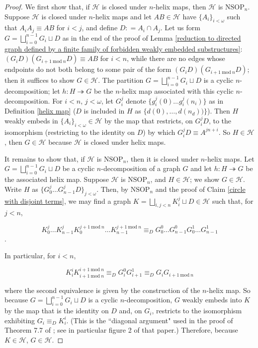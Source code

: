 \documentclass{amsart}
\theoremstyle{definition}
\theoremstyle{remark}
\numberwithin{equation}{section}
\begin{document}
\begin{proof}
    We first show that, if $\mathcal{H}$ is closed under $n$-helix maps, then $\mathcal{H}$ is $\mathrm{NSOP}_{n}$. Suppose $\mathcal{H}$ is closed under $n$-helix maps and let $AB \in \mathcal{H}$ have $\{A_{i}\}_{i < \omega}$ such that $A_{i} A_{j} \equiv AB$ for $i < j$, and define $D : = A_{i} \cap A_{j}$. Let us form $G = \bigsqcup^{n-1}_{i =0} G_{i} \sqcup D$ as in the end of the proof of Lemma \ref{reduction to directed graph defined by a finite family of forbidden weakly embedded substructures}: $(G_{i}D)(G_{i+1 \mathrm{\: mod \:}n}D)\equiv AB $ for $i < n$, while there are no edges whose endpoints do not both belong to some pair of the form $(G_{i}D)(G_{i+1 \mathrm{\: mod \:}n}D)$; then it suffices to show $G \in \mathcal{H}$. The partition $G = \bigsqcup^{n-1}_{i =0} G_{i} \sqcup D$ is a cyclic $n$-decomposition; let $h: H \twoheadrightarrow G$ be the $n$-helix map associated with this cyclic $n$-decomposition. For $i < n$, $j < \omega$, let $G^{j}_{i}$ denote $\{g^{j}_{i}(0)\ldots g^{j}_{i}(n_{i})\}$ as in Definition \ref{helix map} ($D$ is included in $H$ as $\{d(0), \ldots, d(n_{d}))\}$). Then $H$ weakly embeds in $\{A_{i}\}_{i < \omega} \in \mathcal{H}$ by the map that restricts, on $G^{j}_{i}D$, to the isomorphism (restricting to the identity on $D$) by which $G^{j}_{i}D \equiv A^{jn+ i}$. So $H \in \mathcal{H}$, then $G \in \mathcal{H}$ because $\mathcal{H}$ is closed under helix maps.

    It remains to show that, if $\mathcal{H}$ is $\mathrm{NSOP}_{n}$, then it is closed under $n$-helix maps. Let $G = \bigsqcup^{n-1}_{i =0} G_{i} \sqcup D$ be a cyclic $n$-decomposition of a graph $G$ and let $h: H \twoheadrightarrow G$ be the associated helix map. Suppose $\mathcal{H}$ is $\mathrm{NSOP}_{n}$, and $H \in \mathcal{H}$; we show $G \in \mathcal{H}$. Write $H$ as $\{G^{j}_{0}\ldots G^{j}_{n-1}D\}_{j<\omega}$. Then, by $\mathrm{NSOP}_{n}$ and the proof of Claim \ref{circle with disjoint terms}, we may find a graph $K =\bigsqcup_{i, j < n}K^{j}_{i} \sqcup D \in \mathcal{H}$ such that, for $j < n$, 
    
    $$K^{j}_{0}\ldots K^{j}_{n-1}K^{j+1 \mathrm{\:mod\:}n }_{0}\ldots K^{j+1 \mathrm{\:mod\:}n }_{n-1} \equiv_{D} G^{0}_{0}\ldots G^{0}_{n-1} G^{1}_{0}\ldots G^{1}_{n-1} $$.

    In particular, for $i< n$,

    $$K^{i}_{i}K^{i + 1 \mathrm{\:mod\:}n}_{i + 1 \mathrm{\:mod\:}n} \equiv_{D} G^{0}_{i}G^{1}_{i+1}\equiv_{D} G_{i}G_{i + 1 \mathrm{\:mod\:}n}$$


    where the second equivalence is given by the construction of the $n$-helix map. So because $G = \bigsqcup^{n-1}_{i =0} G_{i} \sqcup D$ is a cyclic $n$-decomposition, $G$ weakly embeds into $K$ by the map that is the identity on $D$ and, on $G_{i}$, restricts to the isomorphism exhibiting $G_{i} \equiv_{D} K^{i}_{i} $. (This is the ``diagonal argument" used in the proof of Theorem 7.7 of \cite{Mal10b}; see in particular figure 2 of that paper.) Therefore, because $K \in \mathcal{H}$, $G \in \mathcal{H}$.
\end{proof}
\end{document}
